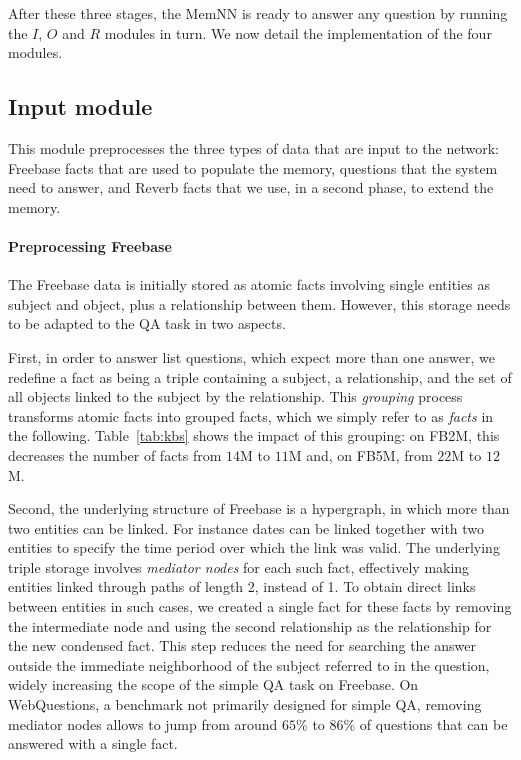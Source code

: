 \documentclass[11pt,a4paper]{article}
\newcommand{\fb}{{\sf Freebase}\xspace}
\newcommand{\wq}{{\sf WebQuestions}\xspace}
\newcommand{\rv}{{\sf Reverb}\xspace}
\newcommand{\fbs}{{\sf FB2M}\xspace}
\newcommand{\fbb}{{\sf FB5M}\xspace}
\begin{document}
After these three stages, the MemNN is ready to answer any question by
running the $I$, $O$ and $R$ modules in turn. 
We now detail the implementation of the four modules.

\subsection{Input module}
\label{sec:MemNNinput}
This module preprocesses the three types of data that are
input to the network: \fb facts that are used to populate the memory,
questions that the system need to answer, and \rv facts
that we use, in a second phase, to extend the memory.

\paragraph{Preprocessing Freebase}
The \fb data is initially stored as atomic facts involving single
entities as subject and object, plus a relationship between
them. However, this storage needs to be adapted to the QA task in two
aspects.

First, in order to answer list questions, which expect more than one
answer, we redefine a fact as being a triple containing a subject, a
relationship, and the set of all objects linked to the subject by the
relationship. This {\it grouping} process transforms atomic facts
into grouped facts, which we simply refer to as {\it facts} in the
following.
Table~\ref{tab:kbs} shows the impact of this grouping: on \fbs, this
decreases the number of facts from $14$M to $11$M and, on \fbb, from
$22$M to $12$M.



Second, the underlying structure of \fb is a hypergraph, in which
more than two entities can be linked. For instance dates can be linked
together with two entities to specify the time period over which the
link was valid. The underlying triple storage involves {\it mediator
  nodes} for each such fact, effectively making entities linked
through paths of length 2, instead of 1. To obtain direct
links between entities in such cases, we created a single fact for
these facts by removing the intermediate node and using the
second relationship as the relationship for the new condensed fact. This
step reduces the need for searching the answer outside the immediate
neighborhood of the subject referred to in the question, widely
increasing the scope of the simple QA task on \fb.
On \wq, a benchmark not primarily designed for simple
QA, removing mediator nodes allows to jump from around $65$\% to
$86$\% of questions that can be answered with a single fact.
\end{document}

